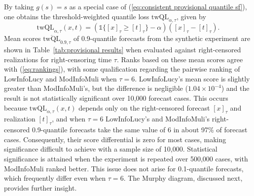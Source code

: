 \documentclass[10pt]{article} %
\theoremstyle{theorem}
\theoremstyle{definition}
\newcommand{\one}{\mathds{1}}
\newcommand{\twQL}{\mathrm{twQL}}
\begin{document}
By taking $g(s)=s$ as a special case of (\ref{eq:consistent provisional quantile sf}), one obtains the threshold-weighted quantile loss $\twQL_{\alpha,\tau}$, given by
\begin{equation}\label{eq:twCL}
\twQL_{\alpha,\tau}(x,t) = (\one\{[x]_\tau\geq [t]_\tau\} - \alpha)([x]_\tau-[t]_\tau).
\end{equation}
Mean scores $\overline{\twQL}_{0.9,\tau}$ of 0.9-quantile forecasts from the synthetic experiment are shown in Table~\ref{tab:provisional results} when evaluated against right-censored realizations for right-censoring time $\tau$. Ranks based on these mean scores agree with (\ref{eq:rankings}), with some qualification regarding the pairwise ranking of LowInfoLucy and ModInfoMuli when $\tau=6$. LowInfoLucy's mean score is slightly greater than ModInfoMuli's, but the difference is negligible ($1.04\times10^{-4}$) and the result is not statistically significant over 10,000 forecast cases. This occurs because $\twQL_{\alpha,\tau}(x,t)$ depends only on the right-censored forecast $[x]_\tau$ and realization $[t]_\tau$, and when $\tau=6$ LowInfoLucy's and ModInfoMuli's right-censored 0.9-quantile forecasts take the same value of 6 in about 97\% of forecast cases. Consequently, their score differential is zero for most cases, making significance difficult to achieve with a sample size of 10,000. Statistical significance is attained when the experiment is repeated over 500,000 cases, with ModInfoMuli ranked better. This issue does not arise for 0.1-quantile forecasts, which frequently differ even when $\tau=6$. The Murphy diagram, discussed next, provides further insight.
\end{document}
